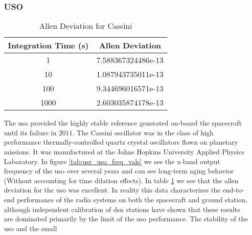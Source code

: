 \documentclass{article}
\begin{document}
            \subsubsection{\footnotesize{USO}}
                \label{subsubsec:usr_USO}
                \begin{table}[H]
                    \centering
                    \captionsetup{type=table}
                    \caption{Allen Deviation for Cassini}
                    \label{tab:Allen_Deviation_for_Cassini}
                    \begin{tabular}{|c|c|}
                        \hline
                        Integration Time (s)&Allen Deviation\\
                        \hline
                        1&7.588367324486e-13\\
                        10&1.087943735011e-13\\
                        100&9.344696016571e-13\\
                        1000&2.603035874178e-13\\
                        \hline
                    \end{tabular}
                \end{table}
                The \gls{uso} provided the highly stable
                reference generated on-board the spacecraft
                until its failure in $2011$. The Cassini
                oscillator was in the class of high performance
                thermally-controlled quartz crystal oscillators
                flown on planetary missions. It was manufactured
                at the Johns Hopkins University Applied Physics
                Laboratory. In figure
                \ref{tab:usr_uso_freq_vals} we see the
                \gls{x-band} output frequency of the \gls{uso}
                over several years and can see long-term aging
                behavior
                (Without accounting for time dilation effects).
                In table \ref{tab:Allen_Deviation_for_Cassini}
                we see that the \gls{allen deviation} for the
                \gls{uso} was excellent. In reality this data
                characterizes the end-to-end performance of
                the radio systems on both the spacecraft and
                ground station, although independent
                calibration of \gls{dsn} stations have shown
                that these results are dominated primarily by
                the limit of the \gls{uso} performance.
                The stability of the \gls{uso} and the small
\end{document}
